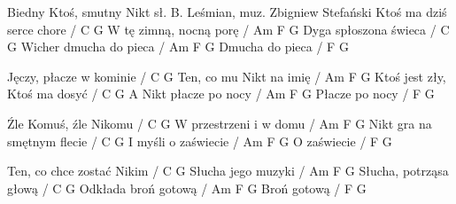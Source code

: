 Biedny Ktoś, smutny Nikt
sł. B. Leśmian, muz. Zbigniew Stefański
Ktoś ma dziś serce chore / C G
W tę zimną, nocną porę / Am F G
Dyga spłoszona świeca / C G
Wicher dmucha do pieca  / Am F G
Dmucha do pieca / F G

Jęczy, płacze w kominie / C G
Ten, co mu Nikt na imię / Am F G
Ktoś jest zły, Ktoś ma dosyć / C G
A Nikt płacze po nocy / Am F G
Płacze po nocy / F G

Źle Komuś, źle Nikomu / C G
W przestrzeni i w domu / Am F G
Nikt gra na smętnym flecie / C G
I myśli o zaświecie / Am F G
O zaświecie / F G

Ten, co chce zostać Nikim / C G
Słucha jego muzyki / Am F G
Słucha, potrząsa głową / C G
Odkłada broń gotową / Am F G
Broń gotową / F G
